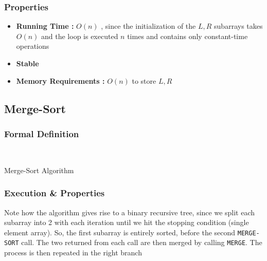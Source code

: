 \subsubsection{Properties}

		\begin{itemize}
			\item\textbf{Running Time : } $O(n)$ , since the initialization of
the $L , R$ subarrays takes $O(n)$ and the loop is executed $n$ times and
contains only constant-time operations
			\item\textbf{Stable}
			\item\textbf{Memory Requirements : } $O(n)$ to store $L, R$	
		\end{itemize}

\subsection{Merge-Sort}


\subsubsection{Formal Definition}

	\begin{algorithm}[H]
	\DontPrintSemicolon
	\SetAlgoLined{}
	\\
	\caption{Merge-Sort Algorithm}
	\end{algorithm}

\subsubsection{Execution \& Properties}


\par{Note how the algorithm gives rise to a binary recursive tree, since we
split each subarray into 2 with each iteration until we hit the stopping
condition (single element array). So, the first subarray is entirely sorted,
before the second \texttt{MERGE-SORT} call. The two  returned
from each call are then merged by calling \texttt{MERGE}. The process is then
repeated in the right branch}

